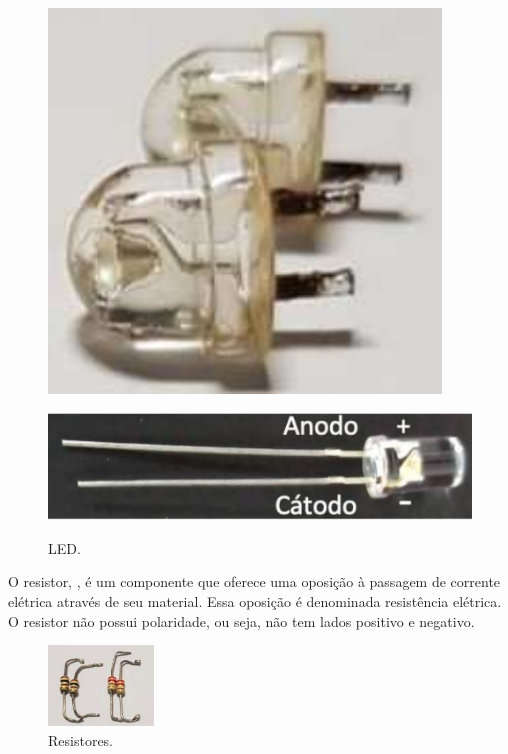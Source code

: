 \documentclass{textolivre}
\begin{document}
\begin{figure}[h!]
\begin{minipage}{0.27\textwidth}
\includegraphics[width=\linewidth]{figure-10.pdf}
\subcaption{}\label{fig05a}
\end{minipage}
\hfill
\begin{minipage}{0.47\textwidth} 
\includegraphics[width=\linewidth]{figure-11.pdf}
\subcaption{}\label{fig05b}
\end{minipage}
\caption{LED.}
\label{fig05}
\end{figure}

O resistor, , é um componente que oferece uma oposição à passagem de
corrente elétrica através de seu material. Essa oposição é denominada
resistência elétrica. O resistor não possui polaridade, ou seja, não tem lados
positivo e negativo.

\begin{figure}[htbp]
\centering
\includegraphics[width=0.25\textwidth]{figure-12.pdf}
\caption{Resistores.}
\label{fig06}
\end{figure}
\end{document}
